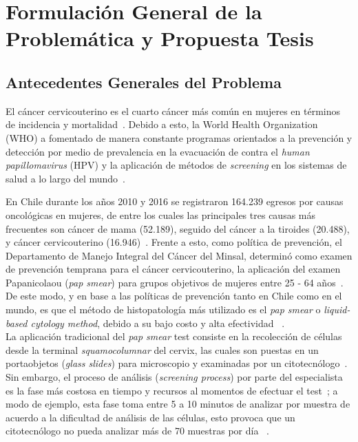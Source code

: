 \documentclass[10pt]{article}
\begin{document}
\newpage
\section[]{Formulación General de la Problemática y Propuesta Tesis}

\subsection{Antecedentes Generales del Problema}
El cáncer cervicouterino es el cuarto cáncer más común en mujeres en términos de incidencia y mortalidad~\cite{9789283204480}. Debido a esto, la World Health Organization (WHO) a fomentado de manera constante programas orientados a la prevención y detección por medio de prevalencia en la evacuación de contra el \textit{human papillomavirus} (HPV) y la aplicación de métodos de \textit{screening} en los sistemas de salud a lo largo del mundo~\cite{9789283204480}.

En Chile durante los años  2010 y 2016 se registraron 164.239 egresos por causas oncológicas en mujeres, de entre los cuales las principales tres causas más frecuentes son cáncer de mama (52.189), seguido del cáncer a la tiroides (20.488), y cáncer cervicouterino (16.946)~\cite{PNC20182028}. Frente a esto, como política de prevención, el Departamento de Manejo Integral del Cáncer del Minsal, determinó como examen de prevención temprana para el cáncer cervicouterino, la aplicación del examen Papanicolaou (\textit{pap smear}) para grupos objetivos de mujeres entre 25 - 64 años~\cite{PNC20182028}.
De este modo, y en base a las políticas de prevención tanto en Chile como en el mundo, es que el método de histopatología más utilizado es el \textit{pap smear} o \textit{liquid-based cytology method}, debido a su bajo costo y alta efectividad ~\cite{Saslow2012, Davey2006, PNC20182028}.\\

La aplicación tradicional del \textit{pap smear} test consiste en la recolección de células desde la terminal \textit{squamocolumnar} del cervix, las cuales son puestas en un portaobjetos (\textit{glass slides}) para microscopio y examinadas por un citotecnólogo~\cite{canjclin.23.3.174, PAPANICOLAOU1941193}. Sin embargo, el proceso de análisis (\textit{screening process}) por parte del especialista es la fase más costosa en tiempo y recursos al momentos de efectuar el test~\cite{9179730}; a modo de ejemplo, esta fase toma entre 5 a 10 minutos de analizar por muestra de acuerdo a la dificultad de análisis de las células, esto provoca que un citotecnólogo no pueda analizar más de 70 muestras por día ~\cite{Elsheikh2012}.\\
\end{document}
